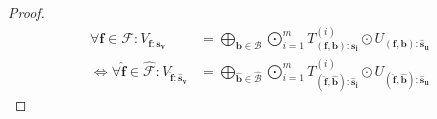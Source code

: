 \begin{proof}
    \begin{align*}
        \forall \bm{f} \in \mathcal{F}: V_{\bm{f}: \bm{s_v}}                              & = \bigoplus\limits_{\bm{b} \in \mathcal{B}} \bigodot\limits_{i = 1}^{m} T^{(i)}_{(\bm{f}, \bm{b}):\bm{s_i}} \odot U_{(\bm{f}, \bm{b}):\bm{\hat{s}_u}}                                           \\
        \iff \forall \bm{\hat{f}} \in \mathcal{\hat{F}}: V_{\bm{\hat{f}}: \bm{\hat{s}_v}} & = \bigoplus\limits_{\bm{\hat{b}} \in \mathcal{\hat{B}}} \bigodot\limits_{i = 1}^{m} T^{(i)}_{(\bm{\hat{f}}, \bm{\hat{b}}):\bm{\hat{s}_i}} \odot U_{(\bm{\hat{f}}, \bm{\hat{b}}):\bm{\hat{s}_u}}
    \end{align*}



\end{proof}
